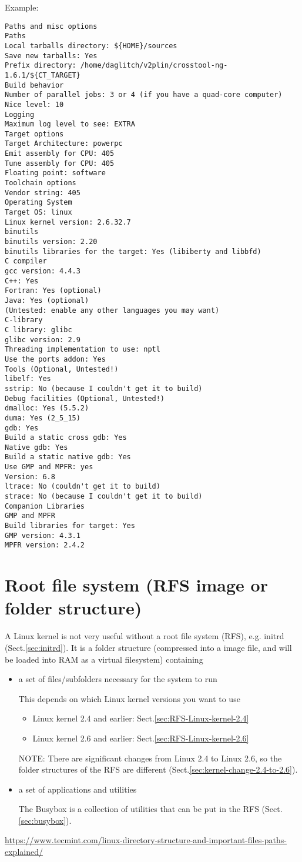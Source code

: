 Example:
\begin{verbatim}
Paths and misc options
Paths
Local tarballs directory: ${HOME}/sources
Save new tarballs: Yes
Prefix directory: /home/daglitch/v2plin/crosstool-ng-1.6.1/${CT_TARGET}
Build behavior
Number of parallel jobs: 3 or 4 (if you have a quad-core computer)
Nice level: 10
Logging
Maximum log level to see: EXTRA
Target options
Target Architecture: powerpc
Emit assembly for CPU: 405
Tune assembly for CPU: 405
Floating point: software
Toolchain options
Vendor string: 405
Operating System
Target OS: linux
Linux kernel version: 2.6.32.7
binutils
binutils version: 2.20
binutils libraries for the target: Yes (libiberty and libbfd)
C compiler
gcc version: 4.4.3
C++: Yes
Fortran: Yes (optional)
Java: Yes (optional)
(Untested: enable any other languages you may want)
C-library
C library: glibc
glibc version: 2.9
Threading implementation to use: nptl
Use the ports addon: Yes
Tools (Optional, Untested!)
libelf: Yes
sstrip: No (because I couldn't get it to build)
Debug facilities (Optional, Untested!)
dmalloc: Yes (5.5.2)
duma: Yes (2_5_15)
gdb: Yes
Build a static cross gdb: Yes
Native gdb: Yes
Build a static native gdb: Yes
Use GMP and MPFR: yes
Version: 6.8
ltrace: No (couldn't get it to build)
strace: No (because I couldn't get it to build)
Companion Libraries
GMP and MPFR
Build libraries for target: Yes
GMP version: 4.3.1
MPFR version: 2.4.2
\end{verbatim}


\section{Root file system (RFS image or folder structure)}
\label{sec:root-file-system}
\label{sec:RFS}

A Linux kernel is not very useful without a root file system (RFS), e.g. initrd
(Sect.\ref{sec:initrd}). It is a folder structure (compressed into a image file,
and will be loaded into RAM as a virtual filesystem) containing
\begin{itemize}
  \item a set of files/subfolders necessary for the system to run

This depends on which Linux kernel versions you want to use
\begin{itemize}
  \item Linux kernel 2.4 and earlier: Sect.\ref{sec:RFS-Linux-kernel-2.4}
  \item Linux kernel 2.6 and earlier: Sect.\ref{sec:RFS-Linux-kernel-2.6}
\end{itemize}
NOTE: There are significant changes from Linux 2.4 to Linux 2.6, so the folder
structures of the RFS are different (Sect.\ref{sec:kernel-change-2.4-to-2.6}).
  
  \item a set of applications and utilities

The Busybox is a collection of utilities that can be put in the RFS
(Sect.\ref{sec:busybox}).

\end{itemize}
\url{https://www.tecmint.com/linux-directory-structure-and-important-files-paths-explained/}

